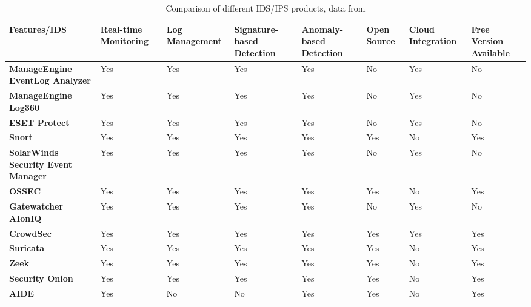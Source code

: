 \documentclass[
	letterpaper, %
	10pt, %
	unnumberedsections, %
	twoside, %
]{APAAssignment}
\begin{document}
\begin{table}[!ht]
    \centering
    \begin{tabular}{|p{2.2cm}|p{1.5cm}|p{1.5cm}|p{1.5cm}|p{1.5cm}|p{1.5cm}|p{1.5cm}|p{1.5cm}|}
    \hline
        \textbf{Features/IDS} & \textbf{Real-time Monitoring} & \textbf{Log Management} & \textbf{Signature-based Detection} & \textbf{Anomaly-based Detection} & \textbf{Open Source} & \textbf{Cloud Integration} & \textbf{Free Version Available} \\ \hline
        \textbf{ManageEngine EventLog Analyzer} & Yes & Yes & Yes & Yes & No & Yes & No \\ \hline
        \textbf{ManageEngine Log360} & Yes & Yes & Yes & Yes & No & Yes & No \\ \hline
        \textbf{ESET Protect} & Yes & Yes & Yes & Yes & No & Yes & No \\ \hline
        \textbf{Snort} & Yes & Yes & Yes & Yes & Yes & No & Yes \\ \hline
        \textbf{SolarWinds Security Event Manager} & Yes & Yes & Yes & Yes & No & Yes & No \\ \hline
        \textbf{OSSEC} & Yes & Yes & Yes & Yes & Yes & No & Yes \\ \hline
        \textbf{Gatewatcher AIonIQ} & Yes & Yes & Yes & Yes & No & Yes & No \\ \hline
        \textbf{CrowdSec} & Yes & Yes & Yes & Yes & Yes & Yes & Yes \\ \hline
        \textbf{Suricata} & Yes & Yes & Yes & Yes & Yes & No & Yes \\ \hline
        \textbf{Zeek} & Yes & Yes & Yes & Yes & Yes & No & Yes \\ \hline
        \textbf{Security Onion} & Yes & Yes & Yes & Yes & Yes & No & Yes \\ \hline
        \textbf{AIDE} & Yes & No & No & Yes & Yes & No & Yes \\ \hline
    \end{tabular}
	\caption{Comparison of different IDS/IPS products, data from \cite{ComparitechIPSComparison}} 
	\label{tab:IPSProdicts}
\end{table}
\end{document}
